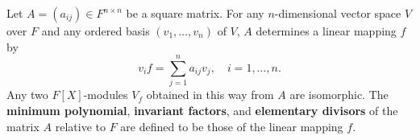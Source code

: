 Let $A = (a_{ij}) \in F^{n \times n}$ be a square matrix. For any $n$-dimensional vector space $V$ over $F$ and any ordered basis $(v_1, \ldots, v_n)$ of $V$, $A$ determines a linear mapping $f$ by
$$v_i f = \sum_{j=1}^{n} a_{ij} v_j, \quad i = 1, \ldots, n.$$
Any two $F[X]$-modules $V_f$ obtained in this way from $A$ are isomorphic. The \textbf{minimum polynomial}, \textbf{invariant factors}, and \textbf{elementary divisors} of the matrix $A$ relative to $F$ are defined to be those of the linear mapping $f$.
